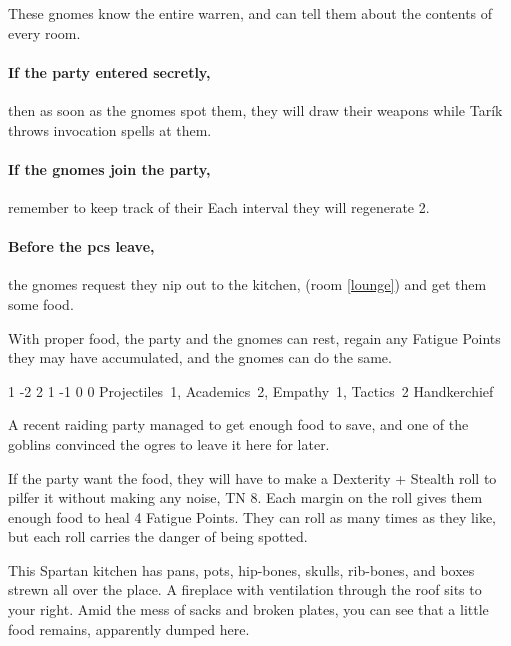 \begin{multicols}{2}
These gnomes know the entire warren, and can tell them about the contents of every room.

\paragraph{If the party entered secretly,}
then as soon as the gnomes spot them, they will draw their weapons while Tar\'ik throws invocation spells at them.

\paragraph{If the gnomes join the party,}
remember to keep track of their 
Each \gls{interval} they will regenerate 2.

\paragraph{Before the \glspl{pc} leave,}
the gnomes request they nip out to the kitchen, (room \ref{lounge}) and get them some food.

With proper food, the party and the gnomes can rest, regain any Fatigue Points they may have accumulated, and the gnomes can do the same.




{1}%
{-2}%
{{2}%
{1}%
{-1}}%
{0}%
{0}%
{Projectiles~1, Academics~2, Empathy~1, Tactics~2}%
{Handkerchief}%
{
  \setcounter{Fire}{2}
  \setcounter{Air}{2}
}


A recent raiding party managed to get enough food to save, and one of the goblins convinced the ogres to leave it here for later.

If the party want the food, they will have to make a Dexterity + Stealth roll to pilfer it without making any noise, TN 8.
Each margin on the roll gives them enough food to heal 4 Fatigue Points.
They can roll as many times as they like, but each roll carries the danger of being spotted.

\begin{boxtext}
  This Spartan kitchen has pans, pots, hip-bones, skulls, rib-bones, and boxes strewn all over the place.
  A fireplace with ventilation through the roof sits to your right.
  Amid the mess of sacks and broken plates, you can see that a little food remains, apparently dumped here.
\end{boxtext}


\end{multicols}
